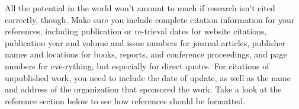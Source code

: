 \documentclass[opre,nonblindrev]{informs3}
\begin{document}
All the potential in the world won't amount to much if research
isn't cited correctly, though. Make sure you include complete
citation information for your references, including publication or
re-trieval dates for website citations, publication year and volume
and issue numbers for journal articles, publisher names and
locations for books, reports, and conference proceedings, and page
numbers for eve-rything, but especially for direct quotes. For
citations of unpublished work, you need to include the date of
update, as well as the name and address of the organization that
sponsored the work. Take a look at the reference section below to
see how references should be formatted.


%
%
%







\end{document}
